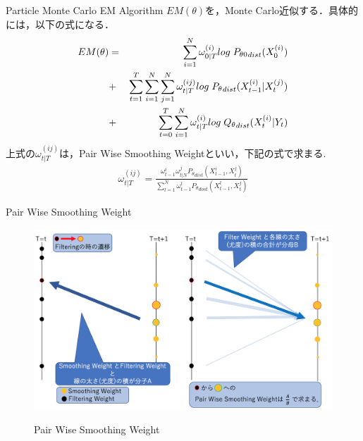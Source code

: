 \documentclass[dvipdfmx]{beamer}
\begin{document}
\begin{frame}{Particle Monte Carlo EM Algorithm}
$EM(\theta)$を，Monte Carlo近似する．具体的には，以下の式になる．
\begin{eqnarray*}
EM(\theta)&=&\sum_{i=1}^N \omega_{0|T}^{(i)} log\hspace{1mm} {P_{\theta0}}_{dist}(X_0^{(i)})\\
&+&\sum_{t=1}^T \sum_{i=1}^N\sum_{j=1}^N \omega_{t|T}^{(ij)} log\hspace{1mm} {P_{\theta}}_{dist}(X_{t-1}^{(i)}|X_{t}^{(j)})\\
&+&\sum_{t=0}^T \sum_{i=1}^N \omega_{t|T}^{(i)} log\hspace{1mm} {Q_{\theta}}_{dist}(X_t^{(i)}|Y_t) 
\end{eqnarray*}
上式の$\omega_{t|T}^{(ij)}$は，Pair Wise Smoothing Weightといい，下記の式で求まる.\\
\begin{eqnarray*}
\omega_{t|T}^{(ij)}=\frac{\omega_{t-1}^i\omega_{t|N}^j {P_\theta}_{dist}(X_{t-1}^{i},X_{t}^{j})}{\sum_{l=1}^N \omega_{t-1}^{l}{P_\theta}_{dost}(X_{t-1}^{l},X_{t}^{j})}
\end{eqnarray*}
\end{frame}


\begin{frame}{Pair Wise Smoothing Weight}
\begin{figure}[h]
\begin{center}
  \includegraphics[scale=0.39]{figure/pair_img.png} \\
\label{fig:Em}
\end{center}
\caption{Pair Wise Smoothing Weight}
\end{figure}
\end{frame}
\end{document}
